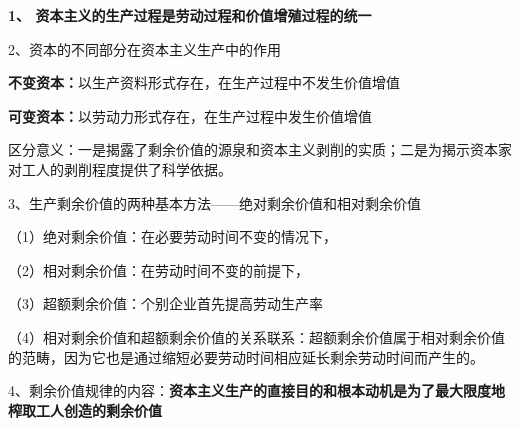 {\textbf{1、 资本主义的生产过程是劳动过程和价值增殖过程的统一}}

2、资本的不同部分在资本主义生产中的作用

\textbf{不变资本：}以生产资料形式存在，在生产过程中不发生价值增值

\textbf{可变资本：}以劳动力形式存在，在生产过程中发生价值增值

区分意义：一是揭露了剩余价值的源泉和资本主义剥削的实质；二是为揭示资本家对工人的剥削程度提供了科学依据。

3、生产剩余价值的两种基本方法------绝对剩余价值和相对剩余价值

（1）绝对剩余价值：在必要劳动时间不变的情况下，

（2）相对剩余价值：在劳动时间不变的前提下，

（3）超额剩余价值：个别企业首先提高劳动生产率

（4）相对剩余价值和超额剩余价值的关系联系：超额剩余价值属于相对剩余价值的范畴，因为它也是通过缩短必要劳动时间相应延长剩余劳动时间而产生的。

4、剩余价值规律的内容：{\textbf{资本主义生产的直接目的和根本动机是为了最大限度地榨取工人创造的剩余价值}}
